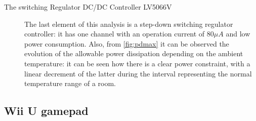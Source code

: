 \documentclass[11pt,a4paper,titlepage]{article}
\begin{document}
\begin{description}
          \item[The switching Regulator DC/DC Controller LV5066V] The last element of this analysis is a step-down switching regulator controller: it has one channel with an operation current of 80$\mu A$ and low power consumption. Also, from \autoref{fig:pdmax} it can be observed the evolution of the allowable power dissipation depending on the ambient temperature: it can be seen how there is a clear power constraint, with a linear decrement of the latter during the interval representing the normal temperature range of a room.

        \end{description}



  \subsection{Wii U gamepad}



\end{document}
